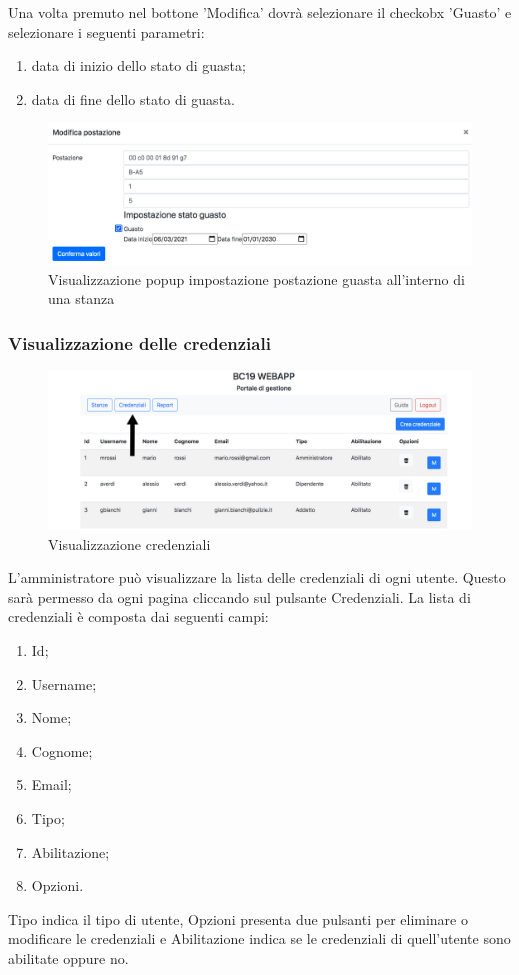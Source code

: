 Una volta premuto nel bottone 'Modifica' dovrà selezionare il checkobx 'Guasto' e selezionare i seguenti parametri:
\begin{enumerate}
	\item data di inizio dello stato di guasta;
	\item data di fine dello stato di guasta.
\end{enumerate}
\begin{figure}[H]
	\centering
	\includegraphics[width=15cm]{res/images/postazioneGuasta.png}
	\caption{Visualizzazione popup impostazione postazione guasta all'interno di una stanza}
\end{figure}

\subsubsection{Visualizzazione delle credenziali}
\begin{figure}[H]
	\centering
	\includegraphics[width=15cm]{res/images/credential.png}
	\caption{Visualizzazione credenziali}
\end{figure}
L’amministratore può visualizzare la lista delle credenziali di ogni utente. Questo sarà permesso da ogni pagina cliccando sul pulsante Credenziali.
La lista di credenziali è composta dai seguenti campi:
\begin{enumerate}
	\item Id;
	\item Username;
	\item Nome;
	\item Cognome;
	\item Email;
	\item Tipo;
	\item Abilitazione;
	\item Opzioni.
\end{enumerate}
Tipo indica il tipo di utente, Opzioni presenta due pulsanti per eliminare o modificare le credenziali e Abilitazione indica se le credenziali di quell'utente sono abilitate oppure no.

